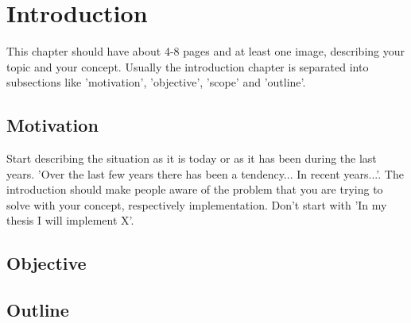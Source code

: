 \chapter{Introduction\label{cha:chapter1}}

This chapter should have about 4-8 pages and at least one image, describing your topic and your concept. Usually the introduction chapter is separated into subsections like 'motivation', 'objective', 'scope' and 'outline'.

\section{Motivation\label{sec:moti}}

Start describing the situation as it is today or as it has been during the last years. 'Over the last few years there has been a tendency... In recent years...'. The introduction should make people aware of the problem that you are trying to solve with your concept, respectively implementation. Don't start with 'In my thesis I will implement X'.

\section{Objective\label{sec:objective}}

\section{Outline\label{sec:outline}}

